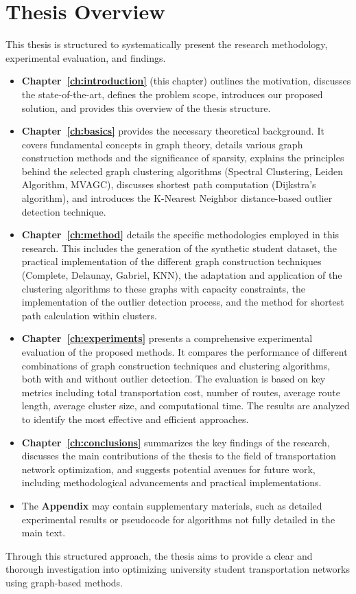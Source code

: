\section{Thesis Overview}
\label{sec:intro_overview}
This thesis is structured to systematically present the research methodology, experimental evaluation, and findings.
\begin{itemize}
    \item \textbf{Chapter~\ref{ch:introduction}} (this chapter) outlines the motivation, discusses the state-of-the-art, defines the problem scope, introduces our proposed solution, and provides this overview of the thesis structure.
    \item \textbf{Chapter~\ref{ch:basics}} provides the necessary theoretical background. It covers fundamental concepts in graph theory, details various graph construction methods and the significance of sparsity, explains the principles behind the selected graph clustering algorithms (Spectral Clustering, Leiden Algorithm, MVAGC), discusses shortest path computation (Dijkstra's algorithm), and introduces the K-Nearest Neighbor distance-based outlier detection technique.
    \item \textbf{Chapter~\ref{ch:method}} details the specific methodologies employed in this research. This includes the generation of the synthetic student dataset, the practical implementation of the different graph construction techniques (Complete, Delaunay, Gabriel, KNN), the adaptation and application of the clustering algorithms to these graphs with capacity constraints, the implementation of the outlier detection process, and the method for shortest path calculation within clusters.
    \item \textbf{Chapter~\ref{ch:experiments}} presents a comprehensive experimental evaluation of the proposed methods. It compares the performance of different combinations of graph construction techniques and clustering algorithms, both with and without outlier detection. The evaluation is based on key metrics including total transportation cost, number of routes, average route length, average cluster size, and computational time. The results are analyzed to identify the most effective and efficient approaches.
    \item \textbf{Chapter~\ref{ch:conclusions}} summarizes the key findings of the research, discusses the main contributions of the thesis to the field of transportation network optimization, and suggests potential avenues for future work, including methodological advancements and practical implementations.
    \item The \textbf{Appendix} may contain supplementary materials, such as detailed experimental results or pseudocode for algorithms not fully detailed in the main text.
\end{itemize}
Through this structured approach, the thesis aims to provide a clear and thorough investigation into optimizing university student transportation networks using graph-based methods.




